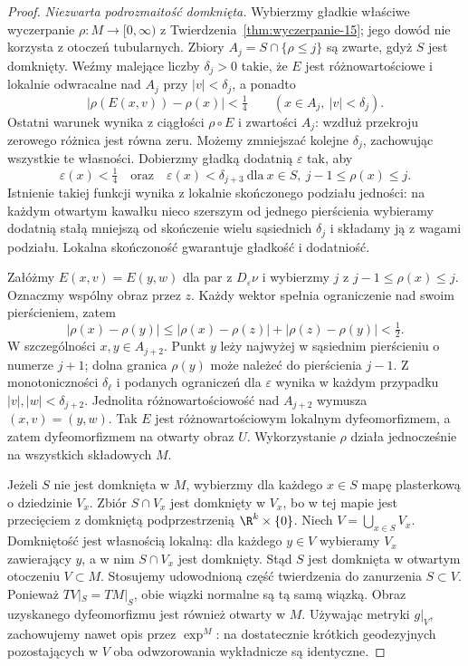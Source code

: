 \begin{proof}
\emph{Niezwarta podrozmaitość domknięta.}
Wybierzmy gładkie właściwe wyczerpanie
$\rho:M\to[0,\infty)$ z
Twierdzenia~\ref{thm:wyczerpanie-15}; jego dowód
nie korzysta z otoczeń tubularnych.
Zbiory $A_j=S\cap\{\rho\leq j\}$
są zwarte, gdyż $S$ jest domknięty.
Weźmy malejące liczby $\delta_j>0$
takie, że $E$ jest różnowartościowe
i lokalnie odwracalne nad $A_j$
przy $|v|<\delta_j$, a ponadto
\[
 |\rho(E(x,v))-\rho(x)|<\tfrac14
 \qquad(x\in A_j,\ |v|<\delta_j).
\]
Ostatni warunek wynika z ciągłości $\rho\circ E$
i zwartości $A_j$: wzdłuż przekroju zerowego
różnica jest równa zeru. Możemy zmniejszać kolejne
$\delta_j$, zachowując wszystkie te własności.
Dobierzmy gładką
dodatnią $\varepsilon$ tak, aby
\[
  \varepsilon(x)<\tfrac14
  \quad\text{oraz}\quad
  \varepsilon(x)<\delta_{j+3}
  \ \text{dla}\ x\in S,\
       j-1\leq\rho(x)\leq j.
\]
Istnienie takiej funkcji wynika
z lokalnie skończonego podziału
jedności: na każdym otwartym kawałku
nieco szerszym od jednego pierścienia
wybieramy dodatnią stałą mniejszą
od skończenie wielu sąsiednich
$\delta_j$ i składamy ją z wagami
podziału. Lokalna skończoność
gwarantuje gładkość i dodatniość.

Załóżmy $E(x,v)=E(y,w)$ dla par
z $D_\varepsilon\nu$ i wybierzmy $j$
z $j-1\leq\rho(x)\leq j$.
Oznaczmy wspólny obraz przez $z$. Każdy wektor
spełnia ograniczenie nad swoim pierścieniem, zatem
\[
 |\rho(x)-\rho(y)|
 \leq |\rho(x)-\rho(z)|+|\rho(z)-\rho(y)|<\tfrac12.
\]
W szczególności $x,y\in A_{j+2}$.
Punkt $y$ leży najwyżej w sąsiednim
pierścieniu o numerze $j+1$; dolna
granica $\rho(y)$ może należeć
do pierścienia $j-1$. Z monotoniczności
$\delta_\ell$ i podanych ograniczeń
dla $\varepsilon$ wynika w każdym
przypadku $|v|,|w|<\delta_{j+2}$.
Jednolita różnowartościowość nad
$A_{j+2}$ wymusza $(x,v)=(y,w)$.
Tak $E$ jest różnowartościowym
lokalnym dyfeomorfizmem, a zatem
dyfeomorfizmem na otwarty obraz $U$.
Wykorzystanie $\rho$ działa
jednocześnie na wszystkich
składowych $M$.

Jeżeli $S$ nie jest domknięta w $M$,
wybierzmy dla każdego $x\in S$
mapę plasterkową o dziedzinie $V_x$.
Zbiór $S\cap V_x$ jest domknięty
w $V_x$, bo w tej mapie jest
przecięciem z domkniętą
podprzestrzenią $\R^k\times\{0\}$.
Niech $V=\bigcup_{x\in S}V_x$.
Domkniętość jest własnością
lokalną: dla każdego $y\in V$
wybieramy $V_x$ zawierający $y$,
a w nim $S\cap V_x$ jest domknięty.
Stąd $S$ jest domknięta w otwartym
otoczeniu $V\subset M$.
Stosujemy udowodnioną część
twierdzenia do zanurzenia $S\subset V$.
Ponieważ $TV|_S=TM|_S$, obie
wiązki normalne są tą samą wiązką.
Obraz uzyskanego dyfeomorfizmu
jest również otwarty w $M$. Używając metryki $g|_V$,
zachowujemy nawet opis przez $\exp^M$: na dostatecznie
krótkich geodezyjnych pozostających w $V$ oba odwzorowania
wykładnicze są identyczne.
\end{proof}

